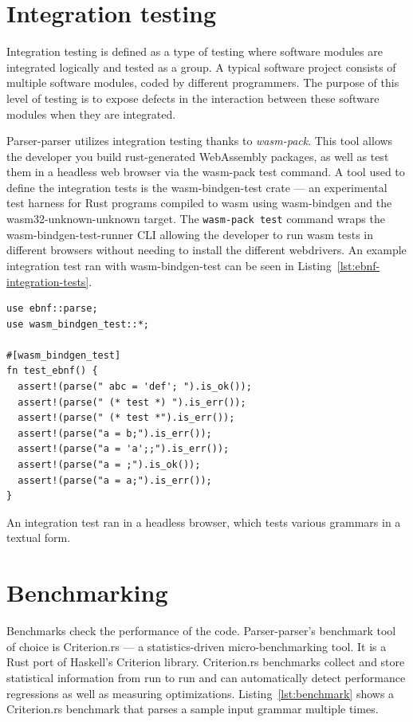 \documentclass[english,bachelors,forcepolishlogotype]{wizthesis}
\newcommand{\thisproject}{Parser-parser}
\begin{document}
\section{Integration testing}

Integration testing is defined as a type of testing where software modules are
integrated logically and tested as a group. A typical software project consists
of multiple software modules, coded by different programmers. The purpose of
this level of testing is to expose defects in the interaction between these
software modules when they are integrated.

\thisproject{} utilizes integration testing thanks to \emph{wasm-pack}. This
tool allows the developer you build rust-generated WebAssembly packages, as well
as test them in a headless web browser via the wasm-pack test command. A tool
used to define the integration tests is the wasm-bindgen-test crate --- an
experimental test harness for Rust programs compiled to wasm using wasm-bindgen
and the wasm32-unknown-unknown target. The \texttt{wasm-pack test} command wraps
the wasm-bindgen-test-runner CLI allowing the developer to run wasm tests in
different browsers without needing to install the different webdrivers. An
example integration test ran with wasm-bindgen-test can be seen in
Listing~\ref{lst:ebnf-integration-tests}.

\begin{listing}[H]
  \begin{verbatim}
use ebnf::parse;
use wasm_bindgen_test::*;

#[wasm_bindgen_test]
fn test_ebnf() {
  assert!(parse(" abc = 'def'; ").is_ok());
  assert!(parse(" (* test *) ").is_err());
  assert!(parse(" (* test *").is_err());
  assert!(parse("a = b;").is_err());
  assert!(parse("a = 'a';;").is_err());
  assert!(parse("a = ;").is_ok());
  assert!(parse("a = a;").is_err());
}
  \end{verbatim}
  \caption{An integration test ran in a headless browser, which tests various
  grammars in a textual form.}
  \label{lst:ebnf-integration-tests}
\end{listing}

\section{Benchmarking}

Benchmarks check the performance of the code. \thisproject{}'s benchmark tool of
choice is Criterion.rs --- a statistics-driven micro-benchmarking tool. It is a
Rust port of Haskell's Criterion library. Criterion.rs benchmarks collect and
store statistical information from run to run and can automatically detect
performance regressions as well as measuring optimizations.
Listing~\ref{lst:benchmark} shows a Criterion.rs benchmark that parses a sample
input grammar multiple times.
\end{document}
